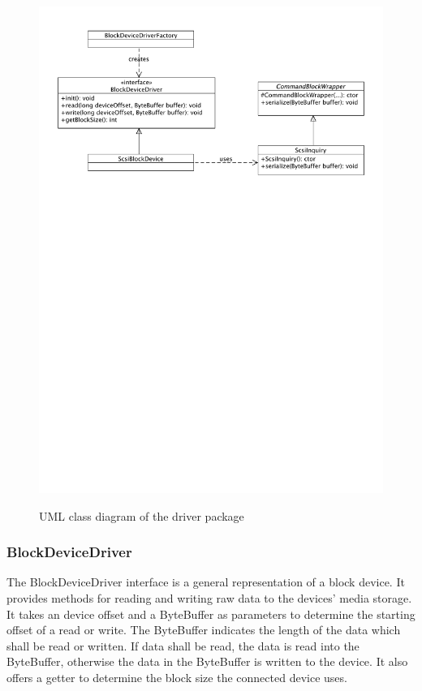 \begin{figure}[h!]
\caption{UML class diagram of the driver package}
\centering
\includegraphics[scale=0.8]{figures/driver_package}
\label{figure:driver_package}
\end{figure}

\subsubsection{BlockDeviceDriver}

The BlockDeviceDriver interface is a general representation of a block device. It provides methods for reading and writing raw data to the devices' media storage. It takes an device offset and a ByteBuffer as parameters to determine the starting offset of a read or write. The ByteBuffer indicates the length of the data which shall be read or written. If data shall be read, the data is read into the ByteBuffer, otherwise the data in the ByteBuffer is written to the device. It also offers a getter to determine the block size the connected device uses.

